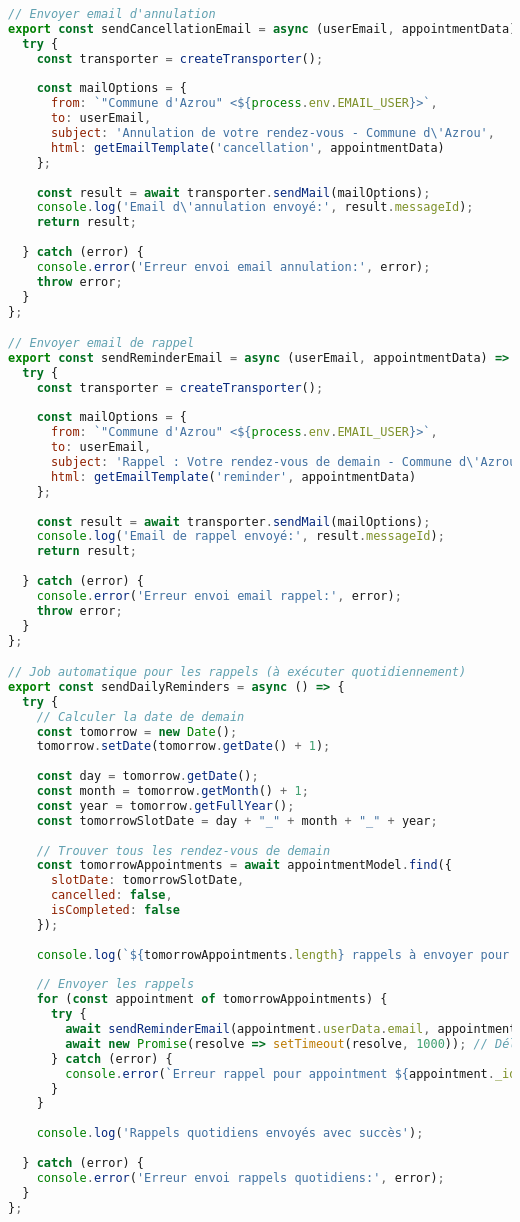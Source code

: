 \begin{lstlisting}[language=JavaScript, caption=emailService.js - Service complet de notifications]
// Envoyer email d'annulation
export const sendCancellationEmail = async (userEmail, appointmentData) => {
  try {
    const transporter = createTransporter();
    
    const mailOptions = {
      from: `"Commune d'Azrou" <${process.env.EMAIL_USER}>`,
      to: userEmail,
      subject: 'Annulation de votre rendez-vous - Commune d\'Azrou',
      html: getEmailTemplate('cancellation', appointmentData)
    };
    
    const result = await transporter.sendMail(mailOptions);
    console.log('Email d\'annulation envoyé:', result.messageId);
    return result;
    
  } catch (error) {
    console.error('Erreur envoi email annulation:', error);
    throw error;
  }
};

// Envoyer email de rappel
export const sendReminderEmail = async (userEmail, appointmentData) => {
  try {
    const transporter = createTransporter();
    
    const mailOptions = {
      from: `"Commune d'Azrou" <${process.env.EMAIL_USER}>`,
      to: userEmail,
      subject: 'Rappel : Votre rendez-vous de demain - Commune d\'Azrou',
      html: getEmailTemplate('reminder', appointmentData)
    };
    
    const result = await transporter.sendMail(mailOptions);
    console.log('Email de rappel envoyé:', result.messageId);
    return result;
    
  } catch (error) {
    console.error('Erreur envoi email rappel:', error);
    throw error;
  }
};

// Job automatique pour les rappels (à exécuter quotidiennement)
export const sendDailyReminders = async () => {
  try {
    // Calculer la date de demain
    const tomorrow = new Date();
    tomorrow.setDate(tomorrow.getDate() + 1);
    
    const day = tomorrow.getDate();
    const month = tomorrow.getMonth() + 1;
    const year = tomorrow.getFullYear();
    const tomorrowSlotDate = day + "_" + month + "_" + year;
    
    // Trouver tous les rendez-vous de demain
    const tomorrowAppointments = await appointmentModel.find({
      slotDate: tomorrowSlotDate,
      cancelled: false,
      isCompleted: false
    });
    
    console.log(`${tomorrowAppointments.length} rappels à envoyer pour ${tomorrowSlotDate}`);
    
    // Envoyer les rappels
    for (const appointment of tomorrowAppointments) {
      try {
        await sendReminderEmail(appointment.userData.email, appointment);
        await new Promise(resolve => setTimeout(resolve, 1000)); // Délai entre envois
      } catch (error) {
        console.error(`Erreur rappel pour appointment ${appointment._id}:`, error);
      }
    }
    
    console.log('Rappels quotidiens envoyés avec succès');
    
  } catch (error) {
    console.error('Erreur envoi rappels quotidiens:', error);
  }
};
\end{lstlisting}

